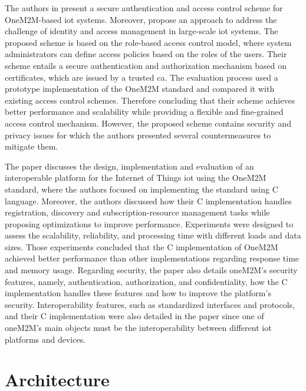 \documentclass[a4paper,fleqn]{cas-dc}
\begin{document}
The authors in \cite{Benoygopal2021} present a secure authentication and access control scheme for OneM2M-based \gls{iot} systems. Moreover, propose an approach to address the challenge of identity and access management in large-scale \gls{iot} systems. The proposed scheme is based on the role-based access control model, where system administrators can define access policies based on the roles of the users. Their scheme entails a secure authentication and authorization mechanism based on certificates, which are issued by a trusted \gls{ca}. The evaluation process used a prototype implementation of the OneM2M standard and compared it with existing access control schemes. Therefore concluding that their scheme achieves better performance and scalability while providing a flexible and fine-grained access control mechanism. However, the proposed scheme contains security and privacy issues for which the authors presented several countermeasures to mitigate them.

The paper \cite{Kim2018} discusses the design, implementation and evaluation of an interoperable platform for the Internet of Things \gls{iot} using the OneM2M standard, where the authors focused on implementing the standard using C language. Moreover, the authors discussed how their C implementation handles registration, discovery and subscription-resource management tasks while proposing optimizations to improve performance. Experiments were designed to assess the scalability, reliability, and processing time with different loads and data sizes. Those experiments concluded that the C implementation of OneM2M achieved better performance than other implementations regarding response time and memory usage. Regarding security, the paper also details oneM2M's security features, namely, authentication, authorization, and confidentiality, how the C implementation handles these features and how to improve the platform's security. Interoperability features, such as standardized interfaces and protocols, and their C implementation were also detailed in the paper since one of oneM2M's main objects must be the interoperability between different \gls{iot} platforms and devices.



\section{Architecture}
\label{architecture}
\end{document}
